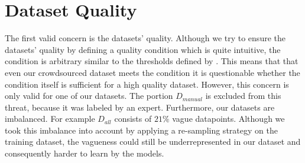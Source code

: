 \section{Dataset Quality}
\label{chp:threats_to_validity:sec:dataset_quality}

The first valid concern is the datasets' quality.
Although we try to ensure the datasets' quality by defining a quality condition which is quite intuitive, the condition is arbitrary similar to the thresholds defined by \textcite{Landis:1977}.
This means that that even our crowdsourced dataset meets the condition it is questionable whether the condition itself is sufficient for a high quality dataset.
However, this concern is only valid for one of our datasets.
The portion $D_{manual}$ is excluded from this threat, because it was labeled by an expert.
Furthermore, our datasets are imbalanced.
For example $D_{all}$ consists of $21\%$ vague datapoints.
Although we took this imbalance into account by applying a re-sampling strategy on the training dataset, the vagueness could still be underrepresented in our dataset and consequently harder to learn by the models.
